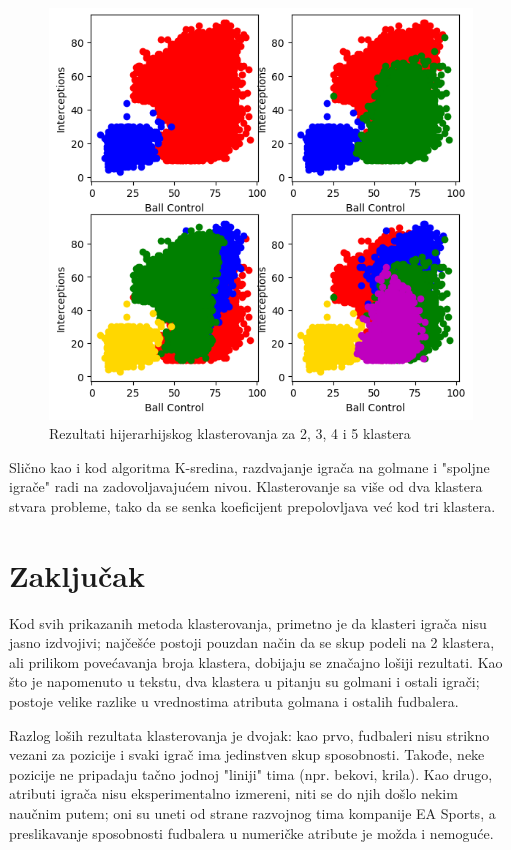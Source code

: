 \documentclass[a4paper]{article}
\begin{document}
\begin{figure}[h!]
\begin{center}
\includegraphics[width=\textwidth]{images/ward_euclidean.png}
\end{center}
\caption{Rezultati hijerarhijskog klasterovanja za 2, 3, 4 i 5 klastera}
\label{fig:ward_euclidean}
\end{figure}

Slično kao i kod algoritma K-sredina, razdvajanje igrača na golmane i "spoljne igrače" radi na zadovoljavajućem nivou. Klasterovanje sa više od dva klastera stvara probleme, tako da se senka koeficijent prepolovljava već kod tri klastera.

\section{Zaključak}
\label{sec:zakljucak}

Kod svih prikazanih metoda klasterovanja, primetno je da klasteri igrača nisu jasno izdvojivi; najčešće postoji pouzdan način da se skup podeli na 2 klastera, ali prilikom povećavanja broja klastera, dobijaju se značajno lošiji rezultati. Kao što je napomenuto u tekstu, dva klastera u pitanju su golmani i ostali igrači; postoje velike razlike u vrednostima atributa golmana i ostalih fudbalera.

Razlog loših rezultata klasterovanja je dvojak: kao prvo, fudbaleri nisu strikno vezani za pozicije i svaki igrač ima jedinstven skup sposobnosti. Takođe, neke pozicije ne pripadaju tačno jodnoj "liniji" tima (npr. bekovi, krila). Kao drugo, atributi igrača nisu eksperimentalno izmereni, niti se do njih došlo nekim naučnim putem; oni su uneti od strane razvojnog tima kompanije EA Sports, a preslikavanje sposobnosti fudbalera u numeričke atribute je možda i nemoguće.
\end{document}
